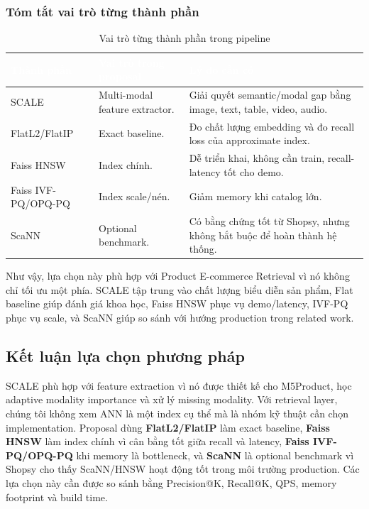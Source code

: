 \documentclass[12pt,a4paper]{article}
\begin{document}
\subsubsection{Tóm tắt vai trò từng thành phần}
\begin{table}[htbp]
\centering
\begin{tabularx}{\linewidth}{@{}L{3cm}YY@{}}
\toprule
{}
\textcolor{white}{\textbf{Thành phần}} & \textcolor{white}{\textbf{Vai trò trong proposal}} & \textcolor{white}{\textbf{Lý do cần có}} \\
\midrule
SCALE & Multi-modal feature extractor. & Giải quyết semantic/modal gap bằng image, text, table, video, audio. \\
FlatL2/FlatIP & Exact baseline. & Đo chất lượng embedding và đo recall loss của approximate index. \\
Faiss HNSW & Index chính. & Dễ triển khai, không cần train, recall-latency tốt cho demo. \\
Faiss IVF-PQ/OPQ-PQ & Index scale/nén. & Giảm memory khi catalog lớn. \\
ScaNN & Optional benchmark. & Có bằng chứng tốt từ Shopsy, nhưng không bắt buộc để hoàn thành hệ thống. \\
\bottomrule
\end{tabularx}
\caption{Vai trò từng thành phần trong pipeline}
\end{table}

Như vậy, lựa chọn này phù hợp với Product E-commerce Retrieval vì nó không chỉ tối ưu một phía. SCALE tập trung vào chất lượng biểu diễn sản phẩm, Flat baseline giúp đánh giá khoa học, Faiss HNSW phục vụ demo/latency, IVF-PQ phục vụ scale, và ScaNN giúp so sánh với hướng production trong related work.

\subsection{Kết luận lựa chọn phương pháp}
SCALE phù hợp với feature extraction vì nó được thiết kế cho M5Product, học adaptive modality importance và xử lý missing modality. Với retrieval layer, chúng tôi không xem ANN là một index cụ thể mà là nhóm kỹ thuật cần chọn implementation. Proposal dùng \textbf{FlatL2/FlatIP} làm exact baseline, \textbf{Faiss HNSW} làm index chính vì cân bằng tốt giữa recall và latency, \textbf{Faiss IVF-PQ/OPQ-PQ} khi memory là bottleneck, và \textbf{ScaNN} là optional benchmark vì Shopsy cho thấy ScaNN/HNSW hoạt động tốt trong môi trường production. Các lựa chọn này cần được so sánh bằng Precision@K, Recall@K, QPS, memory footprint và build time.
\end{document}
